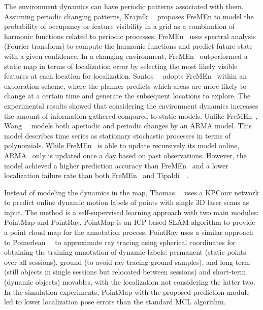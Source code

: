 The environment dynamics can have periodic patterns associated with them.
Assuming periodic changing patterns, Krajník~\etal~\cite{krajník-et-al:2017:2665664} proposes \gls{FreMEn} to model the probability of occupancy or feature visibility in a grid as a combination of harmonic functions related to periodic processes. \gls{FreMEn}~\cite{krajník-et-al:2017:2665664} uses spectral analysis (Fourier transform) to compute the harmonic functions and predict future state with a given confidence. In a changing environment, \gls{FreMEn}~\cite{krajník-et-al:2017:2665664} outperformed a static map in terms of localization error by selecting the most likely visible features at each location for localization.
Santos~\etal~\cite{santos-et-al:2016:2516594} adopts \gls{FreMEn}~\cite{krajník-et-al:2017:2665664} within an exploration scheme, where the planner predicts which areas are more likely to change at a certain time and generate the subsequent locations to explore. The experimental results showed that considering the environment dynamics increases the amount of information gathered compared to static models.
Unlike \gls{FreMEn}~\cite{krajník-et-al:2017:2665664}, Wang~\etal~\cite{wang-et-al:2020:9468884} models both aperiodic and periodic changes by an \gls{ARMA} model. This model describes time series as stationary stochastic processes in terms of polynomials. While \gls{FreMEn}~\cite{krajník-et-al:2017:2665664} is able to update recursively its model online, \gls{ARMA}~\cite{wang-et-al:2020:9468884} only is updated once a day based on past observations. However, the model \cite{wang-et-al:2020:9468884} achieved a higher prediction accuracy than \gls{FreMEn}~\cite{krajník-et-al:2017:2665664} and a lower localization failure rate than both \gls{FreMEn}~\cite{krajník-et-al:2017:2665664} and Tipaldi~\etal~\cite{tipaldi-et-al:2013:0278364913502830}.

Instead of modeling the dynamics in the map, Thomas~\etal~\cite{thomas-et-al:2022:9812297} uses a KPConv network to predict online dynamic motion labels of points with single 3D laser scans as input. The method \cite{thomas-et-al:2022:9812297} is a self-supervised learning approach with two main modules: PointMap and PointRay. PointMap is an \gls{ICP}-based \gls{SLAM} algorithm to provide a point cloud map for the annotation process. PointRay uses a similar approach to Pomerleau~\etal~\cite{pomerleau-et-al:2014:6907397} to approximate ray tracing using spherical coordinates for obtaining the training annotation of dynamic labels: permanent (static points over all sessions), ground (to avoid ray tracing ground samples), and long-term (still objects in single sessions but relocated between sessions) and short-term (dynamic objects) movables, with the localization not considering the latter two. In the simulation experiments, PointMap with the proposed prediction module led to lower localization pose errors than the standard \gls{MCL} algorithm.






